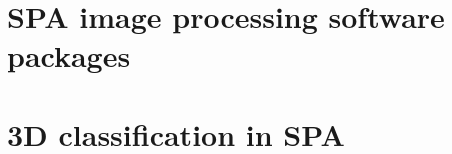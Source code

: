 \documentclass[../main.tex]{subfiles}
\begin{document}
\section{SPA image processing software packages}


\section{3D classification in SPA}

\end{document}
